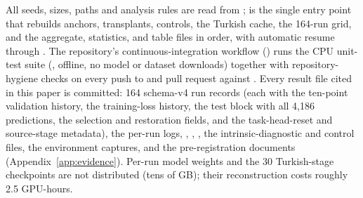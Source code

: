 All seeds, sizes, paths and analysis rules are read from ;  is the single entry point that rebuilds anchors, transplants, controls, the Turkish cache, the 164-run grid, and the aggregate, statistics, and table files in order, with automatic resume through . The repository's continuous-integration workflow () runs the CPU unit-test suite (, offline, no model or dataset downloads) together with repository-hygiene checks on every push to and pull request against . Every result file cited in this paper is committed: 164 schema-v4 run records (each with the ten-point validation history, the training-loss history, the test block with all 4{,}186 predictions, the selection and restoration fields, and the task-head-reset and source-stage metadata), the per-run logs, , , , the intrinsic-diagnostic and control files, the environment captures, and the pre-registration documents (Appendix~\ref{app:evidence}). Per-run model weights and the 30 Turkish-stage checkpoints are not distributed (tens of GB); their reconstruction costs roughly 2.5 GPU-hours.
